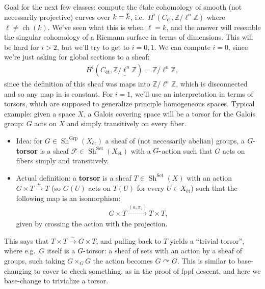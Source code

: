 Goal for the next few classes: compute the étale cohomology of smooth
(not necessarily projective) curves over
\(k=\mkern 1.5mu\overline{\mkern-1.5muk\mkern-1.5mu}\mkern 1.5mu\),
i.e.~\(H^i(C_\text{ét}, \mathbb{Z}/\ell^n\mathbb{Z})\) where
\(\ell \neq \operatorname{ch}(k)\). We've seen what this is when
\(\ell = k\), and the answer will resemble the singular cohomology of a
Riemann surface in terms of dimensions. This will be hard for \(i>2\),
but we'll try to get to \(i=0, 1\). We can compute \(i=0\), since we're
just asking for global sections to a sheaf:
\begin{align*}  
H^i (C_\text{ét}, \underline{\mathbb{Z}/\ell^n\mathbb{Z}}) = \mathbb{Z}/\ell^n\mathbb{Z}
,\end{align*}
since the definition of this sheaf was maps into
\(\mathbb{Z}/\ell^n\mathbb{Z}\), which is disconnected and so any map in
is constant. For \(i=1\), we'll use an interpretation in terms of
torsors, which are supposed to generalize principle homogeneous spaces.
Typical example: given a space \(X\), a Galois covering space will be a
torsor for the Galois group: \(G\) acts on \(X\) and simply transitively
on every fiber.

\begin{definition}

\envlist

\begin{itemize}
\item
  Idea: for
  \(G\in{\operatorname{Sh}}^{{\operatorname{Grp}}}(X_\text{ét})\) a
  sheaf of (not necessarily abelian) groups, a
  \textbf{\(G{\hbox{-}}\)torsor} is a sheaf
  \(\mathcal{F}\in {\operatorname{Sh}}^{\operatorname{Set}}(X_\text{ét})\)
  with a \(G{\hbox{-}}\)action such that \(G\) acts on fibers simply and
  transitively.
\item
  Actual definition: a \textbf{torsor} is a sheaf
  \(T\in {\operatorname{Sh}}^{\operatorname{Set}}(X)\) with an action
  \(G\times T \xrightarrow{a} T\) (so \(G(U)\) acts on \(T(U)\) for
  every \(U\in X_\text{ét}\)) such that the following map is an
  isomorphism:
  \begin{align*}  
  G\times T \xrightarrow{(a, \pi_2)} T\times T
  ,\end{align*}
  given by crossing the action with the projection.
\end{itemize}

\end{definition}

\begin{remark}

This says that \(T\times T \xrightarrow{\sim}G\times T\), and pulling
back to \(T\) yields a ``trivial torsor'', where e.g.~\(G\) itself is a
\(G{\hbox{-}}\)torsor: a sheaf of sets with an action by a sheaf of
groups, such taking \(G\times_G G\) the action becomes
\(G\curvearrowright G\). This is similar to base-changing to cover to
check something, as in the proof of fppf descent, and here we
base-change to trivialize a torsor.

\end{remark}

